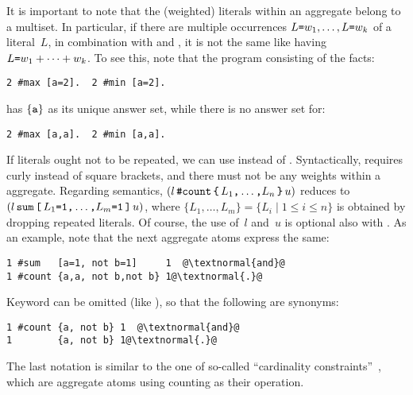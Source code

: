 It is important to note that the (weighted) literals within an aggregate
belong to a multiset.
In particular, if there are multiple occurrences
$L\texttt{=}w_1,\dots,L\texttt{=}w_k$
of a literal~$L$, in combination with  and ,
it is not the same like having $L\texttt{=}w_1+\dots+w_k$.
To see this, note that the program consisting of the facts:
\begin{lstlisting}[numbers=none]
2 #max [a=2].  2 #min [a=2].
\end{lstlisting}
has $\{\texttt{a}\}$ as its unique answer set, while there is no answer set for:
\begin{lstlisting}[numbers=none]
2 #max [a,a].  2 #min [a,a].
\end{lstlisting}

If literals ought not to be repeated,
we can use  instead of .
Syntactically,  requires curly instead of square
brackets, and there must not be any weights within a  aggregate.
Regarding semantics,
$(
  l\,
  \const{\#count} 
  \,
  \code{\char`\{}
  \,
  L_1\code{,}
  \dots\code{,}
  L_n
  \,
  \code{\char`\}}
  \,
  u
)$ 
reduces to
$(
  l\,
  \texttt{sum}
  \,
  \texttt{[}
  \,
  L_1\texttt{=}\texttt{1}\texttt{,}
  \dots\texttt{,}
  L_m\texttt{=}\texttt{1}
  \,
  \texttt{]}
  \,
  u
)$,
where $\{L_1,\dots,L_m\}=\{L_i \mid 1\leq i\leq n\}$ is obtained by dropping
repeated literals.
Of course, the use of~$l$ and~$u$ is optional also with .
As an example, note that the next aggregate atoms express the same:
\begin{lstlisting}[numbers=none,escapechar=@]
1 #sum   [a=1, not b=1]     1  @\textnormal{and}@ 
1 #count {a,a, not b,not b} 1@\textnormal{.}@  
\end{lstlisting}
Keyword  can be omitted (like ),
so that the following are synonyms:
\begin{lstlisting}[numbers=none,escapechar=@]
1 #count {a, not b} 1  @\textnormal{and}@ 
1        {a, not b} 1@\textnormal{.}@  
\end{lstlisting}
The last notation is similar to the one of so-called
``cardinality constraints''~\cite{siniso02a,lparseManual},
which are aggregate atoms using counting as their operation.

